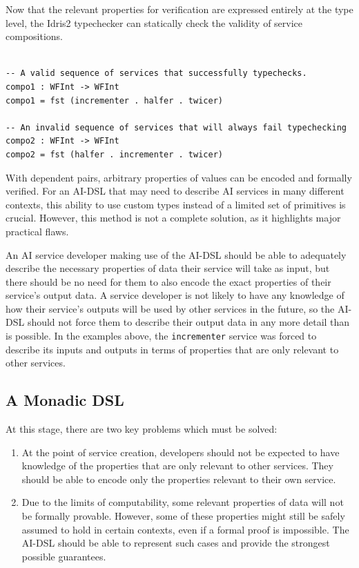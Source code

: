 \documentclass[]{report}
\begin{document}
Now that the relevant properties for verification are expressed entirely at the
type level, the Idris2 typechecker can statically check the validity of service
compositions.

\begin{verbatim}

-- A valid sequence of services that successfully typechecks.
compo1 : WFInt -> WFInt
compo1 = fst (incrementer . halfer . twicer)

-- An invalid sequence of services that will always fail typechecking
compo2 : WFInt -> WFInt
compo2 = fst (halfer . incrementer . twicer)
\end{verbatim}

With dependent pairs, arbitrary properties of values can be encoded and formally
verified.  For an AI-DSL that may need to describe AI services in many different
contexts, this ability to use custom types instead of a limited set of
primitives is crucial.  However, this method is not a complete solution, as it
highlights major practical flaws.

An AI service developer making use of the AI-DSL should be able to adequately
describe the necessary properties of data their service will take as input, but
there should be no need for them to also encode the exact properties of their
service's output data.  A service developer is not likely to have any knowledge
of how their service's outputs will be used by other services in the future, so
the AI-DSL should not force them to describe their output data in any more
detail than is possible.  In the examples above, the \texttt{incrementer}
service was forced to describe its inputs and outputs in terms of properties
that are only relevant to other services.


\subsection{A Monadic DSL}

At this stage, there are two key problems which must be solved:

\begin{enumerate}

  \item At the point of service creation, developers should not be expected to
        have knowledge of the properties that are only relevant to other
        services.  They should be able to encode only the properties relevant to
        their own service.

  \item Due to the limits of computability, some relevant properties of data
        will not be formally provable.  However, some of these properties might
        still be safely assumed to hold in certain contexts, even if a formal
        proof is impossible.  The AI-DSL should be able to represent such cases
        and provide the strongest possible guarantees.

\end{enumerate}
\end{document}
